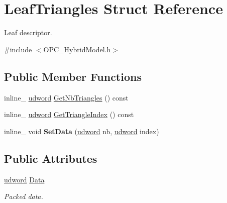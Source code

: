\hypertarget{struct_leaf_triangles}{\section{Leaf\+Triangles Struct Reference}
\label{struct_leaf_triangles}
}


Leaf descriptor.  




{\ttfamily \#include $<$O\+P\+C\+\_\+\+Hybrid\+Model.\+h$>$}

\subsection*{Public Member Functions}
\begin{DoxyCompactItemize}
\item 
inline\+\_\+ \hyperlink{_ice_types_8h_a44c6f1920ba5551225fb534f9d1a1733}{udword} \hyperlink{struct_leaf_triangles_ae4e2a9f6f0c02d7cb40d9bb625603557}{Get\+Nb\+Triangles} () const 
\item 
inline\+\_\+ \hyperlink{_ice_types_8h_a44c6f1920ba5551225fb534f9d1a1733}{udword} \hyperlink{struct_leaf_triangles_ae5274c22470a13c5013a6b4d6b2317af}{Get\+Triangle\+Index} () const 
\item 
\hypertarget{struct_leaf_triangles_aafba126434e6ed3b462615d95d25f74d}{inline\+\_\+ void {\bfseries Set\+Data} (\hyperlink{_ice_types_8h_a44c6f1920ba5551225fb534f9d1a1733}{udword} nb, \hyperlink{_ice_types_8h_a44c6f1920ba5551225fb534f9d1a1733}{udword} index)}\label{struct_leaf_triangles_aafba126434e6ed3b462615d95d25f74d}

\end{DoxyCompactItemize}
\subsection*{Public Attributes}
\begin{DoxyCompactItemize}
\item 
\hypertarget{struct_leaf_triangles_acf6f4448fce3c5d85372ba35d7befd49}{\hyperlink{_ice_types_8h_a44c6f1920ba5551225fb534f9d1a1733}{udword} \hyperlink{struct_leaf_triangles_acf6f4448fce3c5d85372ba35d7befd49}{Data}}\label{struct_leaf_triangles_acf6f4448fce3c5d85372ba35d7befd49}

\begin{DoxyCompactList}\small\item\em Packed data. \end{DoxyCompactList}\end{DoxyCompactItemize}



